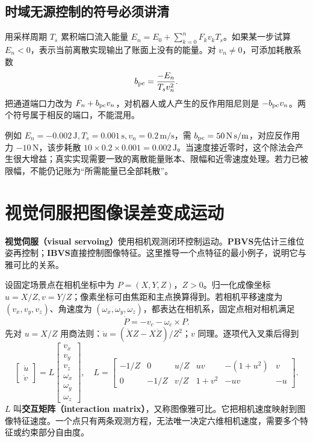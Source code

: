 \subsection{时域无源控制的符号必须讲清}

用采样周期 $T_s$ 累积端口流入能量 $E_n=E_0+\sum_{k=0}^nF_kv_kT_s$。如果某一步试算 $E_n<0$，表示当前离散实现输出了账面上没有的能量。对 $v_n\ne0$，可添加耗散系数
\begin{equation}
b_{\rm pc}=\frac{-E_n}{T_sv_n^2}.
\end{equation}
把通道端口力改为 $F_n+b_{\rm pc}v_n$，对机器人或人产生的反作用阻尼则是 $-b_{\rm pc}v_n$。两个符号属于相反的端口，不能混用。

例如 $E_n=-0.002\,\mathrm J,T_s=0.001\,\mathrm s,v_n=0.2\,\mathrm{m/s}$，需 $b_{\rm pc}=50\,\mathrm{N\,s/m}$，对应反作用力 $-10\,\mathrm N$，该步耗散 $10\times0.2\times0.001=0.002\,\mathrm J$。当速度接近零时，这个除法会产生很大增益；真实实现需要一致的离散能量账本、限幅和近零速度处理。若力已被限幅，不能仍记账为“所需能量已全部耗散”。

\section{视觉伺服把图像误差变成运动}

\textbf{视觉伺服（visual servoing）}使用相机观测闭环控制运动。\textbf{PBVS}先估计三维位姿再控制；\textbf{IBVS}直接控制图像特征。这里推导一个点特征的最小例子，说明它与雅可比的关系。\cite{corke}

设固定场景点在相机坐标中为 $P=(X,Y,Z)$，$Z>0$。归一化成像坐标 $u=X/Z,v=Y/Z$；像素坐标可由焦距和主点换算得到。若相机平移速度为 $(v_x,v_y,v_z)$、角速度为 $(\omega_x,\omega_y,\omega_z)$，都表达在相机系，固定点相对相机满足
\begin{equation}
\dot P=-v_c-\omega_c\times P.
\end{equation}
先对 $u=X/Z$ 用商法则：$\dot u=(\dot XZ-X\dot Z)/Z^2$；$v$ 同理。逐项代入叉乘后得到
\begin{equation}
\begin{bmatrix}\dot u\\\dot v\end{bmatrix}
=L\begin{bmatrix}v_x\\v_y\\v_z\\\omega_x\\\omega_y\\\omega_z\end{bmatrix},\quad
L=\begin{bmatrix}
-1/Z&0&u/Z&uv&-(1+u^2)&v\\
0&-1/Z&v/Z&1+v^2&-uv&-u
\end{bmatrix}.
\end{equation}
$L$ 叫\textbf{交互矩阵（interaction matrix）}，又称图像雅可比。它把相机速度映射到图像特征速度。一个点只有两条观测方程，无法唯一决定六维相机速度，需要多个特征或约束部分自由度。

